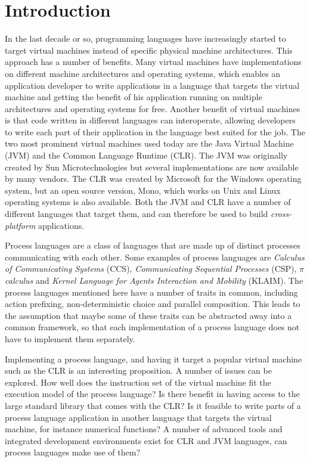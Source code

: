 \chapter{Introduction}

	In the last decade or so, programming languages have increasingly started to 
	target virtual machines instead of specific physical machine architectures. 
	This approach has a number of benefits. Many virtual machines have 
	implementations on different machine architectures and operating systems, 
	which enables an application developer to write applications in a language 
	that targets the virtual machine and getting the benefit of his application 
	running on multiple architectures and operating systems for free. Another 
	benefit of virtual machines is that code written in different languages can 
	interoperate, allowing developers to write each part of their application in 
	the language best suited for the job. The two most prominent virtual 
	machines used today are the Java Virtual Machine (JVM) and the Common 
	Language Runtime (CLR). The JVM was originally created by Sun 
	Microtechnologies but several implementations are now available by many 
	vendors. The CLR was created by Microsoft for the Windows operating system, 
	but an open source version, Mono, which works on Unix and Linux operating 
	systems is also available. Both the JVM and CLR have a number of different 
	languages that target them, and can therefore be used to build 
	\textit{cross-platform} applications. 

	Process languages are a class of languages that are made up of distinct 
	processes communicating with each other. Some examples of process languages 
	are \textit{Calculus of Communicating Systems} (CCS), \textit{Communicating 
	Sequential Processes} (CSP), $\pi$ \textit{calculus} and \textit{Kernel 
	Language for Agents Interaction and Mobility} (KLAIM). The process languages 
	mentioned here have a number of traits in common, including action 
	prefixing, non-deterministic choice and parallel composition. This leads to 
	the assumption that maybe some of these traits can be abstracted away into a 
	common framework, so that each implementation of a process language does not 
	have to implement them separately.

	Implementing a process language, and having it target a popular virtual 
	machine such as the CLR is an interesting proposition. A number of issues 
	can be explored. How well does the instruction set of the virtual machine 
	fit the execution model of the process language? Is there benefit in having 
	access to the large standard library that comes with the CLR? Is it feasible 
	to write parts of a process language application in another language that 
	targets the virtual machine, for instance numerical functions? A number of 
	advanced tools and integrated development environments exist for CLR and JVM 
	languages, can process languages make use of them? 


